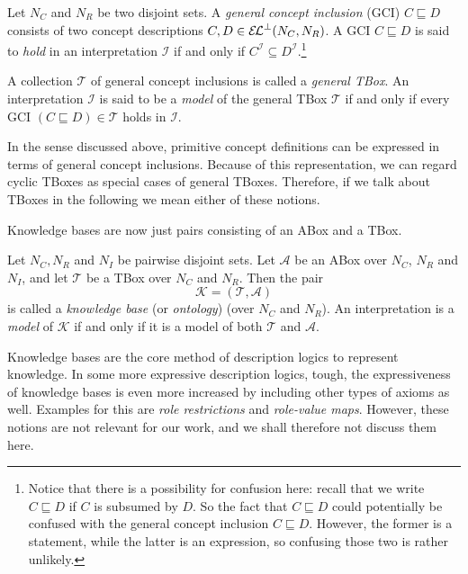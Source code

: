 \begin{Definition}
  \label{def:general-concept-inclusions-and-general-TBoxes}
  Let $N_C$ and $N_R$ be two disjoint sets.  A \emph{general concept inclusion} (GCI) $C
  \sqsubseteq D$ consists of two \ELbot concept descriptions $C, D \in {\ensuremath{{\mathcal{E}\kern-.3ex\mathcal{L}}^\bot}}(N_C, N_R)$.
  A GCI $C \sqsubseteq D$ is said to \emph{hold} in an interpretation $\mathcal{I}$ if and
  only if $C^{\mathcal{I}} \subseteq D^{\mathcal{I}}$.\footnote{Notice that there is a
    possibility for confusion here: recall that we write $C \sqsubseteq D$ if $C$ is
    subsumed by $D$.  So the fact that $C \sqsubseteq D$ could potentially be confused
    with the general concept inclusion $C \sqsubseteq D$.  However, the former is a
    statement, while the latter is an expression, so confusing those two is rather
    unlikely.}

  A collection $\mathcal{T}$ of general concept inclusions is called a \emph{general
    TBox}.  An interpretation $\mathcal{I}$ is said to be a \emph{model} of the general
  TBox $\mathcal{T}$ if and only if every GCI $(C \sqsubseteq D) \in \mathcal{T}$ holds in
  $\mathcal{I}$.
\end{Definition}

In the sense discussed above, primitive concept definitions can be expressed in terms of
general concept inclusions.  Because of this representation, we can regard cyclic TBoxes
as special cases of general TBoxes.  Therefore, if we talk about TBoxes in the following
we mean either of these notions.

Knowledge bases are now just pairs consisting of an ABox and a TBox.
\begin{Definition}
  \label{def:knowledge-base}
  Let $N_C, N_R$ and $N_I$ be pairwise disjoint sets.  Let $\mathcal{A}$ be an ABox over
  $N_C$, $N_R$ and $N_I$, and let $\mathcal{T}$ be a TBox over $N_C$ and $N_R$.  Then the
  pair
  \begin{equation*}
    \mathcal{K} = (\mathcal{T}, \mathcal{A})
  \end{equation*}
  is called a \emph{knowledge base} (or \emph{ontology}) (over $N_C$ and $N_R$).  An
  interpretation is a \emph{model} of $\mathcal{K}$ if and only if it is a model of both
  $\mathcal{T}$ and $\mathcal{A}$.
\end{Definition}

Knowledge bases are the core method of description logics to represent knowledge.  In some
more expressive description logics, tough, the expressiveness of knowledge bases is even
more increased by including other types of axioms as well.  Examples for this are
\emph{role restrictions} and \emph{role-value maps}.  However, these notions are not
relevant for our work, and we shall therefore not discuss them here.

